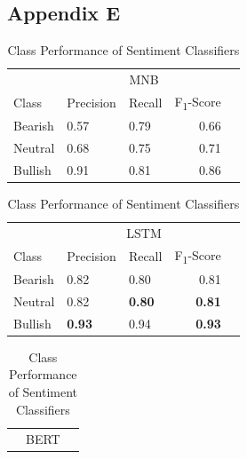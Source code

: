 \documentclass[11pt, a4paper]{article}
\begin{document}
\subsection{Appendix E}
\label{appendix:classification_report_for_classes}

\begin{table}[!htb]
    \caption{Class Performance of Sentiment Classifiers}
    \label{tab:ClassPerformanceOfModels}
    \centering
    \small

    \begin{tabular}{lllrr}
        \toprule
                                        & \multicolumn{3}{c}{MNB} \\
                                        \cmidrule{2-4}
                            Class       & Precision     & Recall    & F\textsubscript{1}-Score \\
            \midrule
            \multirow{1}{*}{Bearish}       & 0.57          & 0.79      & 0.66                      \\
            \midrule
            \multirow{1}{*}{Neutral}       & 0.68          & 0.75      & 0.71                      \\
            \midrule
            \multirow{1}{*}{Bullish}       & 0.91          & 0.81      & 0.86                      \\
        \bottomrule
    \end{tabular}
    \begin{tabular}{lllrr}
                                        & \multicolumn{3}{c}{LSTM} \\
                                        \cmidrule{2-4}
                            Class       & Precision     & Recall    & F\textsubscript{1}-Score \\
            \midrule
            \multirow{1}{*}{Bearish}       & 0.82          & 0.80      & 0.81                      \\
            \midrule
            \multirow{1}{*}{Neutral}       & 0.82          & \textbf{0.80}      & \textbf{0.81}                      \\
            \midrule
            \multirow{1}{*}{Bullish}       & \textbf{0.93}          & 0.94      & \textbf{0.93}                      \\
        \bottomrule
    \end{tabular}
    \begin{tabular}{lllrr}
                                        & \multicolumn{3}{c}{BERT} \\

\end{tabular}
\end{table}
\end{document}
